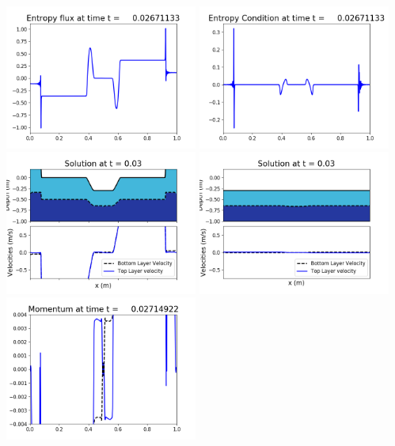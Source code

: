 \documentclass[11pt]{article}
\begin{document}
\includegraphics[width=0.475\textwidth]{frame0062fig1008.png}
\vskip 10pt 
\includegraphics[width=0.475\textwidth]{frame0062fig1009.png}
\vskip 10pt 
\includegraphics[width=0.475\textwidth]{frame0063fig1001.png}
\includegraphics[width=0.475\textwidth]{frame0063fig1002.png}
\vskip 10pt 
\includegraphics[width=0.475\textwidth]{frame0063fig1003.png}
\end{document}
